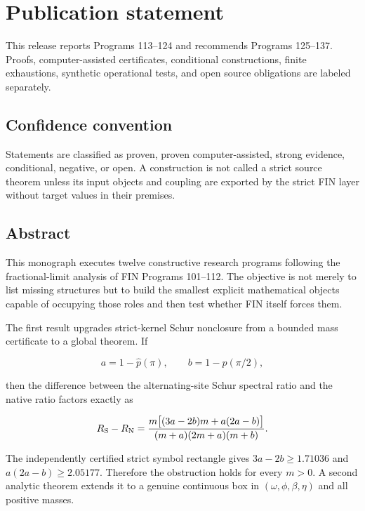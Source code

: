 \documentclass[11pt,a4paper,openany]{report}
\begin{document}
\chapter*{Publication statement}
This release reports Programs 113--124 and recommends Programs 125--137.
Proofs, computer-assisted certificates, conditional constructions, finite
exhaustions, synthetic operational tests, and open source obligations are
labeled separately.

\tableofcontents
\clearpage
{}

\section{Confidence convention}

Statements are classified as proven, proven computer-assisted, strong evidence, conditional, negative, or open. A construction is not called a strict source theorem unless its input objects and coupling are exported by the strict FIN layer without target values in their premises.

\section{Abstract}

This monograph executes twelve constructive research programs following the fractional-limit analysis of FIN Programs 101--112. The objective is not merely to list missing structures but to build the smallest explicit mathematical objects capable of occupying those roles and then test whether FIN itself forces them.

The first result upgrades strict-kernel Schur nonclosure from a bounded mass certificate to a global theorem. If

\[
a=1-\widehat p(\pi),
\qquad
b=1-\widehat p(\pi/2),
\]

then the difference between the alternating-site Schur spectral ratio and the native ratio factors exactly as

\[
R_{\rm S}-R_{\rm N}
=
\frac{
m\big[(3a-2b)m+a(2a-b)\big]
}{
(m+a)(2m+a)(m+b)
}.
\]

The independently certified strict symbol rectangle gives \(3a-2b\ge1.71036\) and \(a(2a-b)\ge2.05177\). Therefore the obstruction holds for every \(m>0\). A second analytic theorem extends it to a genuine continuous box in \((\omega,\phi,\beta,\eta)\) and all positive masses.
\end{document}
